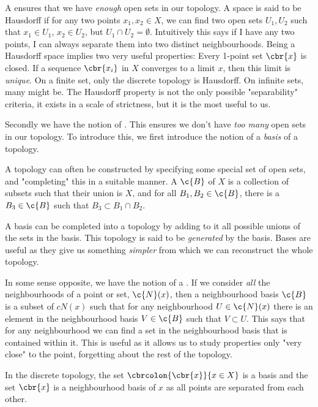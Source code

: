 A  ensures that we have \emph{enough} open sets in our topology.
A space is said to be Hausdorff if for any two points \(x_1, x_2 \in X\), we can find two open sets \(U_1, U_2\) such that \(x_1 \in U_1\), \(x_2 \in U_2\), but \(U_1 \cap U_2 = \emptyset\).
Intuitively this says if I have any two points, I can always separate them into two distinct neighbourhoods.
Being a {Hausdorff space} implies two very useful properties: \1 Every 1-point set \(\cbr{x}\) is closed.
\2 If a sequence \(\cbr{x_i}\) in \(X\) converges to a limit \(x\), then this limit is \emph{unique}.
\0
On a finite set, only the discrete topology is Hausdorff.
On infinite sets, many might be.
The Hausdorff property is not the only possible "separability" criteria, it exists in a scale of strictness, but it is the most useful to us.

Secondly we have the notion of .
This ensures we don't have \emph{too many} open sets in our topology.
To introduce this, we first introduce the notion of a \emph{basis} of a topology.

A topology can often be constructed by specifying some special set of open sets, and "completing" this in a suitable manner.
A  \(\c{B}\) of \(X\) is a collection of subsets such that their union is \(X\), and for all \(B_1, B_2 \in \c{B}\), there is a \(B_3 \in \c{B}\) such that \(B_3 \subset B_1 \cap B_2\).

A basis can be completed into a topology by adding to it all possible unions of the sets in the basis.
This topology is said to be \emph{generated} by the basis.
Bases are useful as they give us something \emph{simpler} from which we can reconstruct the whole topology.

In some sense opposite, we have the notion of a .
If we consider \emph{all} the neighbourhoods of a point or set, \(\c{N}(x)\), then a neighbourhood basis \(\c{B}\) is a subset of \(c{N}(x)\) such that for any neighbourhood \(U \in \c{N}(x)\) there is an element in the neighbourhood basis \(V \in \c{B}\) such that \( V \subset U\).
This says that for any neighbourhood we can find a set in the neighbourhood basis that is contained within it.
This is useful as it allows us to study properties only "very close" to the point, forgetting about the rest of the topology.

In the discrete topology, the set \(\cbrcolon{\cbr{x}}{x\in X}\) is a basis and the set \(\cbr{x}\) is a neighbourhood basis of \(x\) as all points are separated from each other.


